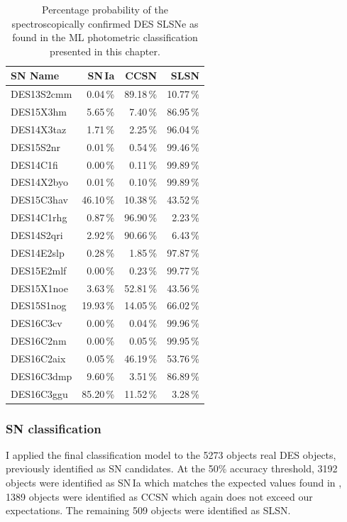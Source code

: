 \begin{table}
  \caption{Percentage probability of the spectroscopically confirmed DES SLSNe as found in the ML photometric classification presented in this chapter.}
  \label{tab:SLSNTruth}
  \centering
  \begin{tabular}{|l|r|r|r|}
    \hline
    SN Name & SN\,Ia & CCSN & SLSN \\
    \hline
    DES13S2cmm & 0.04\,\% & 89.18\,\% & 10.77\,\% \\
    DES15X3hm  & 5.65\,\% & 7.40\,\% & 86.95\,\% \\
    DES14X3taz & 1.71\,\% & 2.25\,\% & 96.04\,\% \\
    DES15S2nr  & 0.01\,\% & 0.54\,\% & 99.46\,\% \\
    DES14C1fi  & 0.00\,\% & 0.11\,\% & 99.89\,\% \\
    DES14X2byo & 0.01\,\% & 0.10\,\% & 99.89\,\% \\
    DES15C3hav & 46.10\,\% & 10.38\,\% & 43.52\,\% \\
    DES14C1rhg & 0.87\,\% & 96.90\,\% & 2.23\,\% \\
    DES14S2qri & 2.92\,\% & 90.66\,\% & 6.43\,\% \\
    DES14E2slp & 0.28\,\% & 1.85\,\% & 97.87\,\% \\
    DES15E2mlf & 0.00\,\% & 0.23\,\% & 99.77\,\% \\
    DES15X1noe & 3.63\,\% & 52.81\,\% & 43.56\,\% \\
    DES15S1nog & 19.93\,\% & 14.05\,\% & 66.02\,\% \\
    DES16C3cv  & 0.00\,\% & 0.04\,\% & 99.96\,\% \\
    DES16C2nm  & 0.00\,\% & 0.05\,\% & 99.95\,\% \\
    DES16C2aix & 0.05\,\% & 46.19\,\% & 53.76\,\% \\
    DES16C3dmp & 9.60\,\% & 3.51\,\% & 86.89\,\% \\
    DES16C3ggu & 85.20\,\% & 11.52\,\% & 3.28\,\% \\
    \hline
  \end{tabular}
\end{table}

\subsubsection{SN classification}
I applied the final classification model to the 5273 objects real DES objects, previously identified as SN candidates. At the 50\% accuracy threshold, 3192 objects were identified as SN\,Ia which matches the expected values found in \citep{Bernstein2012}, 1389 objects were identified as CCSN which again does not exceed our expectations. The remaining 509 objects were identified as SLSN.

